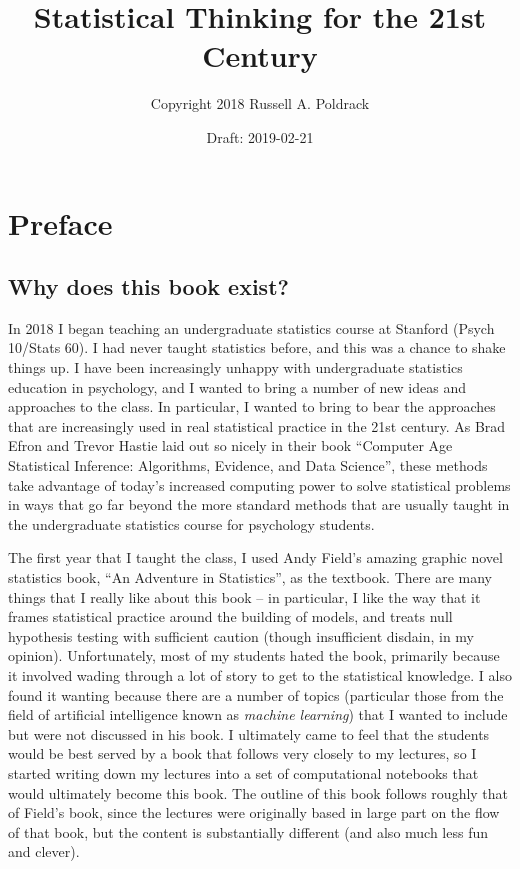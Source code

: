 \documentclass[]{book}
\title{Statistical Thinking for the 21st Century}
\author{Copyright 2018 Russell A. Poldrack}
\date{Draft: 2019-02-21}
\theoremstyle{definition}
\theoremstyle{definition}
\theoremstyle{definition}
\theoremstyle{remark}
\begin{document}
\maketitle

{
\setcounter{tocdepth}{1}
\tableofcontents
}
\chapter*{Preface}\label{preface}

\section{Why does this book exist?}\label{why-does-this-book-exist}

In 2018 I began teaching an undergraduate statistics course at Stanford
(Psych 10/Stats 60). I had never taught statistics before, and this was
a chance to shake things up. I have been increasingly unhappy with
undergraduate statistics education in psychology, and I wanted to bring
a number of new ideas and approaches to the class. In particular, I
wanted to bring to bear the approaches that are increasingly used in
real statistical practice in the 21st century. As Brad Efron and Trevor
Hastie laid out so nicely in their book ``Computer Age Statistical
Inference: Algorithms, Evidence, and Data Science'', these methods take
advantage of today's increased computing power to solve statistical
problems in ways that go far beyond the more standard methods that are
usually taught in the undergraduate statistics course for psychology
students.

The first year that I taught the class, I used Andy Field's amazing
graphic novel statistics book, ``An Adventure in Statistics'', as the
textbook. There are many things that I really like about this book -- in
particular, I like the way that it frames statistical practice around
the building of models, and treats null hypothesis testing with
sufficient caution (though insufficient disdain, in my opinion).
Unfortunately, most of my students hated the book, primarily because it
involved wading through a lot of story to get to the statistical
knowledge. I also found it wanting because there are a number of topics
(particular those from the field of artificial intelligence known as
\emph{machine learning}) that I wanted to include but were not discussed
in his book. I ultimately came to feel that the students would be best
served by a book that follows very closely to my lectures, so I started
writing down my lectures into a set of computational notebooks that
would ultimately become this book. The outline of this book follows
roughly that of Field's book, since the lectures were originally based
in large part on the flow of that book, but the content is substantially
different (and also much less fun and clever).
\end{document}
